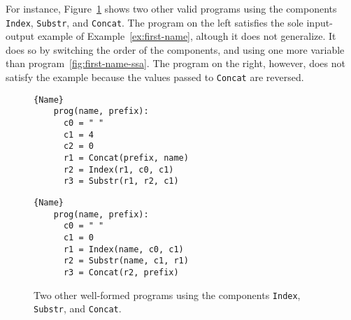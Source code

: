 For instance, Figure~\ref{fig:other-valid-programs} shows two other valid
programs using the components \lstinline{Index}, \lstinline{Substr}, and
\lstinline{Concat}. The program on the left satisfies the sole
input-output example of Example~\ref{ex:first-name}, altough it does not
generalize. It does so by switching the order of the components, and using one
more variable than program~\ref{fig:first-name-ssa}. The program on the right,
however, does not satisfy the example because the values passed to
\lstinline{Concat} are reversed.

\begin{figure}
\noindent
\begin{minipage}{.45\textwidth}
  \begin{lstlisting}[frame=tlrb]{Name}
    prog(name, prefix):
      c0 = " "
      c1 = 4
      c2 = 0
      r1 = Concat(prefix, name)
      r2 = Index(r1, c0, c1)
      r3 = Substr(r1, r2, c1)
  \end{lstlisting}
\end{minipage}\hfill
\begin{minipage}{.45\textwidth}
  \begin{lstlisting}[frame=tlrb]{Name}
    prog(name, prefix):
      c0 = " "
      c1 = 0
      r1 = Index(name, c0, c1)
      r2 = Substr(name, c1, r1)
      r3 = Concat(r2, prefix)
\end{lstlisting}
\end{minipage}
\caption{Two other well-formed programs using the components \lstinline{Index},
  \lstinline{Substr}, and \lstinline{Concat}.}
\label{fig:other-valid-programs}
\end{figure}


